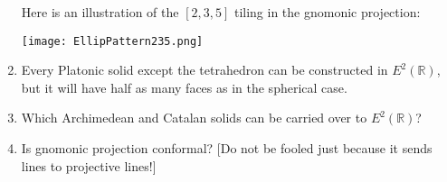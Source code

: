 \documentclass[leqno]{book}
\begin{document}
\begin{enumerate}
Here is an illustration of the $[2,3,5]$ tiling in the gnomonic projection:
\begin{center}
\texttt{[image: EllipPattern235.png]}
\end{center}
\item Every Platonic solid except the tetrahedron can be constructed in $E^2(\mathbb R)$, but it will have half as many faces as in the spherical case.

\item Which Archimedean and Catalan solids can be carried over to $E^2(\mathbb R)$?

\item Is gnomonic projection conformal?  [Do not be fooled just because it sends lines to projective lines!]
\end{enumerate}
\end{document}
